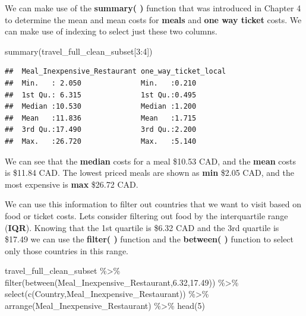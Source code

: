 \documentclass[
]{book}
\newenvironment{Shaded}{\begin{snugshade}}{\end{snugshade}}
\newcommand{\DecValTok}[1]{\textcolor[rgb]{0.00,0.00,0.81}{#1}}
\newcommand{\FloatTok}[1]{\textcolor[rgb]{0.00,0.00,0.81}{#1}}
\newcommand{\FunctionTok}[1]{\textcolor[rgb]{0.00,0.00,0.00}{#1}}
\newcommand{\NormalTok}[1]{#1}
\newcommand{\SpecialCharTok}[1]{\textcolor[rgb]{0.00,0.00,0.00}{#1}}
\begin{document}
We can make use of the \textbf{summary( )} function that was introduced in Chapter 4 to determine the mean and mean costs for \textbf{meals} and \textbf{one way ticket} costs. We can make use of indexing to select just these two columns.

\begin{Shaded}
\begin{Highlighting}[]
\FunctionTok{summary}\NormalTok{(travel\_full\_clean\_subset[}\DecValTok{3}\SpecialCharTok{:}\DecValTok{4}\NormalTok{])}
\end{Highlighting}
\end{Shaded}

\begin{verbatim}
##  Meal_Inexpensive_Restaurant one_way_ticket_local
##  Min.   : 2.050              Min.   :0.210       
##  1st Qu.: 6.315              1st Qu.:0.495       
##  Median :10.530              Median :1.200       
##  Mean   :11.836              Mean   :1.715       
##  3rd Qu.:17.490              3rd Qu.:2.200       
##  Max.   :26.720              Max.   :5.140
\end{verbatim}

We can see that the \textbf{median} costs for a meal \$10.53 CAD, and the \textbf{mean} costs is \$11.84 CAD. The lowest priced meals are shown as \textbf{min} \$2.05 CAD, and the most expensive is \textbf{max} \$26.72 CAD.

We can use this information to filter out countries that we want to visit based on food or ticket costs. Lets consider filtering out food by the interquartile range (\textbf{IQR}). Knowing that the 1st quartile is \$6.32 CAD and the 3rd quartile is \$17.49 we can use the \textbf{filter( )} function and the \textbf{between( )} function to select only those countries in this range.

\begin{Shaded}
\begin{Highlighting}[]
\NormalTok{travel\_full\_clean\_subset }\SpecialCharTok{\%\textgreater{}\%}
  \FunctionTok{filter}\NormalTok{(}\FunctionTok{between}\NormalTok{(Meal\_Inexpensive\_Restaurant,}\FloatTok{6.32}\NormalTok{,}\FloatTok{17.49}\NormalTok{)) }\SpecialCharTok{\%\textgreater{}\%}
  \FunctionTok{select}\NormalTok{(}\FunctionTok{c}\NormalTok{(Country,Meal\_Inexpensive\_Restaurant)) }\SpecialCharTok{\%\textgreater{}\%}
  \FunctionTok{arrange}\NormalTok{(Meal\_Inexpensive\_Restaurant) }\SpecialCharTok{\%\textgreater{}\%}
  \FunctionTok{head}\NormalTok{(}\DecValTok{5}\NormalTok{)}
\end{Highlighting}
\end{Shaded}
\end{document}
